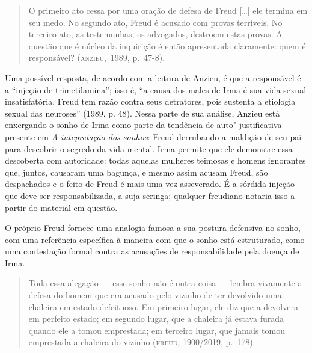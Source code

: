 \begin{quote}
O primeiro ato cessa por uma oração de defesa de Freud {[}\ldots{}{]} ele
termina em seu medo. No segundo ato, Freud é acusado com provas
terríveis. No terceiro ato, as testemunhas, os advogados, destroem estas
provas. A questão que é núcleo da inquirição é então apresentada
claramente: quem é responsável? (\textsc{anzieu},~1989, p.~47-8).
\end{quote}

Uma possível resposta, de acordo com a leitura de Anzieu, é que a
responsável é a ``injeção de trimetilamina''; isso é, ``a causa dos
males de Irma é sua vida sexual insatisfatória. Freud tem razão contra
seus detratores, pois sustenta a etiologia sexual das neuroses'' (1989, p.
48). Nessa parte de sua análise, Anzieu está enxergando o sonho de Irma
como parte da tendência de auto"-justificativa presente em \emph{A
intepretação dos sonhos}: Freud derrubando a maldição de seu pai para
descobrir o segredo da vida mental. Irma permite que ele demonstre essa
descoberta com autoridade: todas aquelas mulheres teimosas e homens
ignorantes que, juntos, causaram uma bagunça, e mesmo assim acusam
Freud, são despachados e o feito de Freud é mais uma vez asseverado. É a
sórdida injeção que deve ser responsabilizada, a suja seringa; qualquer
freudiano notaria isso a partir do material em questão.

O próprio Freud fornece uma analogia famosa a sua postura defensiva no
sonho, com uma referência específica à maneira com que o sonho está
estruturado, como uma contestação formal contra as acusações de
responsabilidade pela doença de Irma.

\begin{quote}
Toda essa alegação --- esse sonho não é outra coisa --- lembra vivamente a
defesa do homem que era acusado pelo vizinho de ter devolvido uma
chaleira em estado defeituoso. Em primeiro lugar, ele diz que a
devolvera em perfeito estado; em segundo lugar, que a chaleira já estava
furada quando ele a tomou emprestada; em terceiro lugar, que jamais
tomou emprestada a chaleira do vizinho (\textsc{freud}, 1900/2019, p.~178).
\end{quote}

